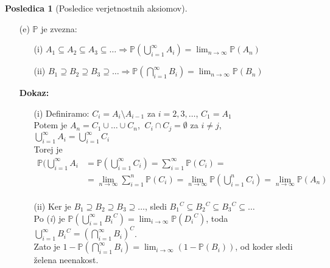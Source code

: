 \documentclass[11pt]{article}
\theoremstyle{definition}
\theoremstyle{definition}
\theoremstyle{definition}
\theoremstyle{theorem}
\newtheorem*{posledica}{Posledica}
\theoremstyle{theorem}
\begin{document}
\begin{posledica}[Posledice verjetnostnih aksiomov]
\begin{enumerate}
\item[(e)] $\mathbb{P}$ je zvezna:
\begin{enumerate}
	\item[(i)] $A_1 \subseteq A_2 \subseteq A_3 \subseteq \ldots \Rightarrow \mathbb{P}(\bigcup_{i=1}^{\infty} A_i) = \lim_{n \rightarrow \infty} \mathbb{P}(A_n)$
	\item[(ii)] $B_1 \supseteq B_2 \supseteq B_3 \supseteq \ldots \Rightarrow \mathbb{P}(\bigcap_{i=1}^{\infty} B_i) = \lim_{n \rightarrow \infty} \mathbb{P}(B_n)$
\end{enumerate} 
\textbf{Dokaz:}
\begin{enumerate}
	\item[(i)] Definiramo: $C_i = A_i \setminus A_{i-1}$ za $i = 2, 3, \ldots$, $C_1 = A_1$ \\
	Potem je $A_n = C_1 \cup \ldots \cup C_n$, $~C_i \cap C_j = \emptyset$ za $i \neq j$, \\ 
	$\bigcup_{i=1}^{\infty} A_i = \bigcup_{i=1}^{\infty} C_i$ \\
	Torej je 
	\begin{align*}
	\mathbb{P}(\bigcup_{i=1}^{\infty} A_i &= \mathbb{P}(\bigcup_{i=1}^{\infty} C_i) = \sum_{i=1}^{\infty} \mathbb{P}(C_i) = \\
	&= \lim_{n \rightarrow \infty} \sum_{i=1}^{n} \mathbb{P}(C_i) = \lim_{n \rightarrow \infty} \mathbb{P}(\bigcup_{i=1}^{n} C_i) = \lim_{n \rightarrow \infty} \mathbb{P}(A_n) \\
	\end{align*}
	\item[(ii)] Ker je $B_1 \supseteq B_2 \supseteq B_3 \supseteq \ldots$, sledi ${B_1}^C \subseteq {B_2}^C \subseteq {B_3}^C \subseteq \ldots$ \\
	Po (\textit{i}) je $\mathbb{P}(\bigcup_{i=1}^{\infty} {B_i}^C) = \lim_{i \rightarrow \infty} \mathbb{P}({D_i}^C)$, toda $\bigcup_{i=1}^{\infty} {B_i}^C = (\bigcap_{i=1}^{\infty} B_i)^C$. \\
	Zato je $1 - \mathbb{P}(\bigcap_{i=1}^{\infty} B_i) = \lim_{i \rightarrow \infty} (1 - \mathbb{P}(B_i))$, od koder sledi želena neenakost.
\end{enumerate}
\end{enumerate}
\end{posledica}
\vspace{0.5cm}
\end{document}
